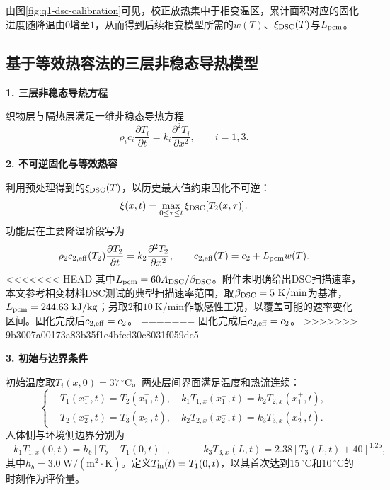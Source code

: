 由图\ref{fig:q1-dsc-calibration}可见，校正放热集中于相变温区，累计面积对应的固化进度随降温由$0$增至$1$，从而得到后续相变模型所需的$w(T)$、$\xi_{\rm DSC}(T)$与$L_{\rm pcm}$。
\FloatBarrier

\subsection{基于等效热容法的三层非稳态导热模型}

\noindent\textbf{1. 三层非稳态导热方程}\par

织物层与隔热层满足一维非稳态导热方程
\begin{equation}
\rho_i c_i\frac{\partial T_i}{\partial t}=k_i\frac{\partial^2T_i}{\partial x^2},\qquad i=1,3.
\label{eq:q1-governing-13}
\end{equation}

\noindent\textbf{2. 不可逆固化与等效热容}\par

利用预处理得到的$\xi_{\rm DSC}(T)$，以历史最大值约束固化不可逆：
\begin{equation}
\xi(x,t)=\max_{0\le\tau\le t}\xi_{\rm DSC}[T_2(x,\tau)].
\label{eq:q1-xi-history}
\end{equation}
功能层在主要降温阶段写为
\begin{equation}
\rho_2c_{2,\rm eff}(T_2)\frac{\partial T_2}{\partial t}=k_2\frac{\partial^2T_2}{\partial x^2},
\qquad
c_{2,\rm eff}(T)=c_2+L_{\rm pcm}w(T).
\label{eq:q1-ceff}
\end{equation}
<<<<<<< HEAD
其中$L_{\rm pcm}=60A_{\rm DSC}/\beta_{\rm DSC}$。附件未明确给出DSC扫描速率，本文参考相变材料DSC测试的典型扫描速率范围\cite{ref}，取$\beta_{\rm DSC}=5\ \mathrm{K/min}$为基准，$L_{\rm pcm}=244.63\ \mathrm{kJ/kg}$；另取$2$和$10\ \mathrm{K/min}$作敏感性工况，以覆盖可能的速率变化区间。固化完成后$c_{2,\rm eff}=c_2$。
=======
固化完成后$c_{2,\rm eff}=c_2$。
>>>>>>> 9b3007a00173a83b35f1e4bfcd30c8031f059dc5

\noindent\textbf{3. 初始与边界条件}\par

初始温度取$T_i(x,0)=37\,^{\circ}\mathrm C$。两处层间界面满足温度和热流连续：
\begin{equation}
\left\{
\begin{aligned}
&T_1(x_1^-,t)=T_2(x_1^+,t),\quad k_1T_{1,x}(x_1^-,t)=k_2T_{2,x}(x_1^+,t),\\
&T_2(x_2^-,t)=T_3(x_2^+,t),\quad k_2T_{2,x}(x_2^-,t)=k_3T_{3,x}(x_2^+,t).
\end{aligned}
\right.
\label{eq:q1-interface}
\end{equation}
人体侧与环境侧边界分别为
\begin{equation}
-k_1T_{1,x}(0,t)=h_b[T_b-T_1(0,t)],
\qquad
-k_3T_{3,x}(L,t)=2.38[T_3(L,t)+40]^{1.25},
\label{eq:q1-boundaries}
\end{equation}
其中$h_b=3.0\ \mathrm{W/(m^2\cdot K)}$。定义$T_{\rm in}(t)=T_1(0,t)$，以其首次达到$15\,^{\circ}\mathrm C$和$10\,^{\circ}\mathrm C$的时刻作为评价量。

